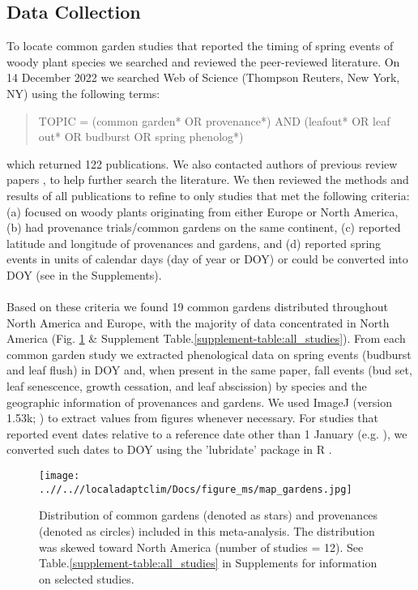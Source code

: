 \documentclass{article}
\begin{document}
\subsection{Data Collection}
To locate common garden studies that reported the timing of spring events of woody plant species we searched and reviewed the peer-reviewed literature. On 14 December 2022 we searched Web of Science (Thompson Reuters, New York, NY) using the following terms:
\begin{quote}
TOPIC = (common garden* OR provenance*) AND (leafout* OR leaf out* OR budburst OR spring phenolog*)
\end{quote}
which returned 122 publications. We also contacted authors of previous review papers \citep{AitkenBemmels16, Alberto13}, to help further search the literature. We then reviewed the methods and results of all publications to refine to only studies that met the following criteria: (a) focused on woody plants originating from either Europe or North America, (b) had provenance trials/common gardens on the same continent, (c) reported latitude and longitude of provenances and gardens, and (d) reported spring events in units of calendar days (day of year or DOY) or could be converted into DOY (see  in the Supplements).
\\
\\
Based on these criteria we found 19 common gardens distributed throughout North America and Europe, with the majority of data concentrated in North America (Fig. \ref{figure:map_gardens} \& Supplement Table.\ref{supplement-table:all_studies}). From each common garden study we extracted phenological data on spring events (budburst and leaf flush) in DOY and, when present in the same paper, fall events (bud set, leaf senescence, growth cessation, and leaf abscission) by species and the geographic information of provenances and gardens. We used ImageJ (version 1.53k; \citealp{schneider_rasband_eliceiri_2012}) to extract values from figures whenever necessary. For studies that reported event dates relative to a reference date other than 1 January (e.g. \citealp{Rehfeldt1994}), we converted such dates to DOY using the 'lubridate' package in R \citep{Grolemund11}.
\\
\begin{figure}[!h] 
    \centering
 \texttt{[image: ..//..//localadaptclim/Docs/figure\_ms/map\_gardens.jpg]}
    \caption{Distribution of common gardens (denoted as stars) and provenances (denoted as circles) included in this meta-analysis. The distribution was skewed toward North America (number of studies = 12). See Table.\ref{supplement-table:all_studies} in Supplements for information on selected studies.} 
    \label{figure:map_gardens}
\end{figure}
\end{document}

